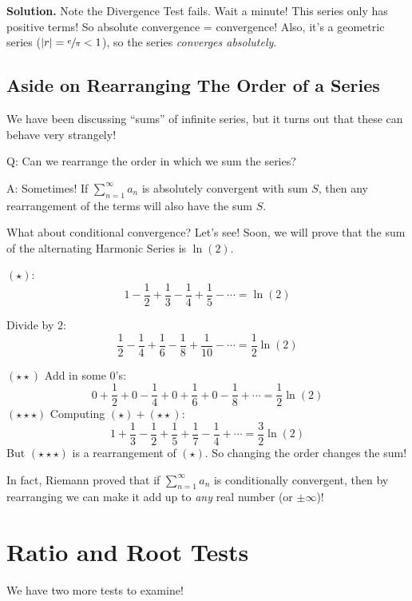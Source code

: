 \begin{Example}{}{}
\begin{enumerate}[label=(\roman*)]
              \textbf{Solution.} Note the Divergence Test fails. Wait a minute! This series only has positive
              terms! So absolute convergence = convergence! Also, it's a geometric series
              ($ \lvert r\rvert=\sfrac{e}{\pi} <1 $), so the series \emph{converges absolutely}.
    \end{enumerate}
\end{Example}

\subsection*{Aside on Rearranging The Order of a Series}
We have been discussing ``sums'' of infinite series, but it turns out
that these can behave very strangely!

Q\@: Can we rearrange the order in which we sum the series?

A\@: Sometimes! If $ \sum\limits_{n=1}^{\infty} a_n $ is absolutely convergent
with sum $ S $, then any rearrangement of the terms will also have the sum $ S $.

What about conditional convergence? Let's see! Soon, we will prove that the sum
of the alternating Harmonic Series is $ \ln(2) $.

$ (\star) $:
\[
    1-\frac{1}{2} +\frac{1}{3} -\frac{1}{4} +\frac{1}{5} -\cdots=\ln(2)
\]

Divide by $ 2 $:
\[ \frac{1}{2} -\frac{1}{4} +\frac{1}{6} -\frac{1}{8} +\frac{1}{10} -\cdots=\frac{1}{2}\ln(2) \]

$ (\star\star) $ Add in some $ 0 $'s:
\[ 0+\frac{1}{2}+0-\frac{1}{4} +0+\frac{1}{6} +0-\frac{1}{8} +\cdots=
    \frac{1}{2} \ln(2) \]
$ (\star\star\star) $ Computing $ (\star) + (\star\star)$:
\[ 1+\frac{1}{3} -\frac{1}{2} +\frac{1}{5} +\frac{1}{7} -\frac{1}{4} +\cdots
    =\frac{3}{2} \ln(2)
\]
But $ (\star\star\star) $ is a rearrangement of $ (\star) $. So changing the order changes the sum!

In fact, Riemann proved that if $ \sum\limits_{n=1}^{\infty} a_n $ is conditionally
convergent, then by rearranging we can make it add up to \emph{any} real number
(or $ \pm\infty $)!

\section{Ratio and Root Tests}
We have two more tests to examine!

